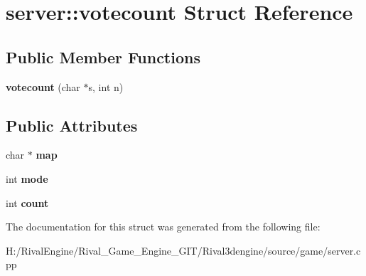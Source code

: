 \hypertarget{structserver_1_1votecount}{}\section{server\+:\+:votecount Struct Reference}
\label{structserver_1_1votecount}
\subsection*{Public Member Functions}
\begin{DoxyCompactItemize}
\item 
\mbox{\label{structserver_1_1votecount_a5f9365328584b64ab486f6d1e9ce5f91}} 
{\bfseries votecount} (char $\ast$s, int n)
\end{DoxyCompactItemize}
\subsection*{Public Attributes}
\begin{DoxyCompactItemize}
\item 
\mbox{\label{structserver_1_1votecount_a3b1c5cb014adc86ec0b8865f1ab7d7d3}} 
char $\ast$ {\bfseries map}
\item 
\mbox{\label{structserver_1_1votecount_a911f1ba33c9c1f09597812ac9acc8d6e}} 
int {\bfseries mode}
\item 
\mbox{\label{structserver_1_1votecount_ac9c2b687b6b091c6a605cd454b061d02}} 
int {\bfseries count}
\end{DoxyCompactItemize}


The documentation for this struct was generated from the following file\+:\begin{DoxyCompactItemize}
\item 
H\+:/\+Rival\+Engine/\+Rival\+\_\+\+Game\+\_\+\+Engine\+\_\+\+G\+I\+T/\+Rival3dengine/source/game/server.\+cpp\end{DoxyCompactItemize}
